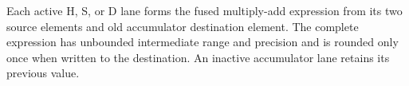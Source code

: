 Each active H, S, or D lane forms the fused multiply-add expression from its
two source elements and old accumulator destination element. The complete
expression has unbounded intermediate range and precision and is rounded only
once when written to the destination. An inactive accumulator lane retains
its previous value.

